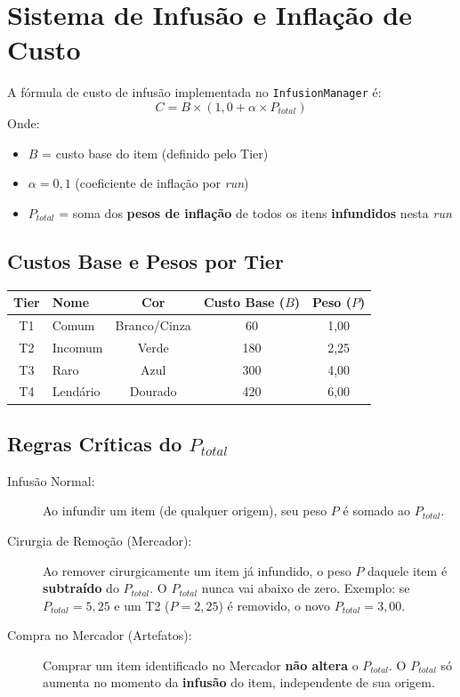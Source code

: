 \documentclass[a4paper,12pt]{report}
\begin{document}
\section{Sistema de Infusão e Inflação de Custo}\label{sec:inflacao}

A fórmula de custo de infusão implementada no \texttt{InfusionManager} é:
\[
C = B \times (1{,}0 + \alpha \times P_{total})
\]
Onde:
\begin{itemize}
    \item $B$ = custo base do item (definido pelo Tier)
    \item $\alpha = 0{,}1$ \quad (coeficiente de inflação por \textit{run})
    \item $P_{total}$ = soma dos \textbf{pesos de inflação} de todos os itens \textbf{infundidos} nesta \textit{run}
\end{itemize}

\subsection{Custos Base e Pesos por Tier}
\begin{center}
\begin{tabular}{|c|l|c|c|c|}
    \hline
    \textbf{Tier} & \textbf{Nome} & \textbf{Cor} & \textbf{Custo Base ($B$)} & \textbf{Peso ($P$)} \\
    \hline
    T1 & Comum    & Branco/Cinza & 60  & 1,00 \\
    T2 & Incomum  & Verde        & 180 & 2,25 \\
    T3 & Raro     & Azul         & 300 & 4,00 \\
    T4 & Lendário & Dourado      & 420 & 6,00 \\
    \hline
\end{tabular}
\end{center}

\subsection{Regras Críticas do $P_{total}$}

\begin{description}
    \item[Infusão Normal:] Ao infundir um item (de qualquer origem), seu peso $P$ é somado ao $P_{total}$.
    \item[Cirurgia de Remoção (Mercador):] Ao remover cirurgicamente um item já infundido, o peso $P$ daquele item é \textbf{subtraído} do $P_{total}$. O $P_{total}$ nunca vai abaixo de zero. Exemplo: se $P_{total} = 5{,}25$ e um T2 ($P = 2{,}25$) é removido, o novo $P_{total} = 3{,}00$.
    \item[Compra no Mercador (Artefatos):] Comprar um item identificado no Mercador \textbf{não altera} o $P_{total}$. O $P_{total}$ só aumenta no momento da \textbf{infusão} do item, independente de sua origem.
\end{description}
\end{document}
